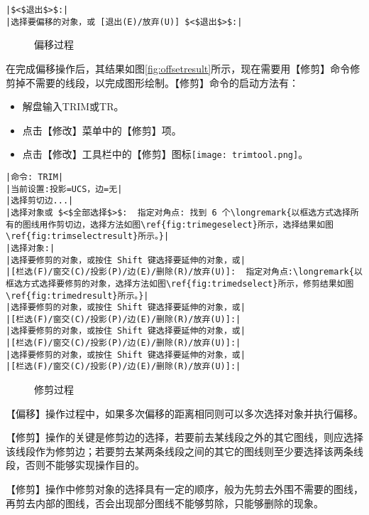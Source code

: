 \begin{procedure}
\begin{lstlisting}
|$<$退出$>$:|
|选择要偏移的对象，或 [退出(E)/放弃(U)] $<$退出$>$:|
\end{lstlisting}
\begin{figure}[htbp]
\hspace{20pt}
\hspace{20pt}
\caption{偏移过程}
\end{figure}
\item 在完成偏移操作后，其结果如图\ref{fig:offsetresult}所示，现在需要用【修剪】命令修剪掉不需要的线段，以完成图形绘制。【修剪】命令的启动方法有：
\begin{itemize}
\item 解盘输入TRIM或TR。
\item 点击【修改】菜单中的【修剪】项。
\item 点击【修改】工具栏中的【修剪】图标\texttt{[image: trimtool.png]}。
\end{itemize}
\begin{lstlisting}
|命令: TRIM|
|当前设置:投影=UCS，边=无|
|选择剪切边...|
|选择对象或 $<$全部选择$>$:  指定对角点: 找到 6 个\longremark{以框选方式选择所有的图线用作剪切边，选择方法如图\ref{fig:trimegeselect}所示，选择结果如图\ref{fig:trimselectresult}所示。}|
|选择对象:|
|选择要修剪的对象，或按住 Shift 键选择要延伸的对象，或|
|[栏选(F)/窗交(C)/投影(P)/边(E)/删除(R)/放弃(U)]:  指定对角点:\longremark{以框选方式选择要修剪的对象，选择方法如图\ref{fig:trimedselect}所示，修剪结果如图\ref{fig:trimedresult}所示。}|
|选择要修剪的对象，或按住 Shift 键选择要延伸的对象，或|
|[栏选(F)/窗交(C)/投影(P)/边(E)/删除(R)/放弃(U)]:|
|选择要修剪的对象，或按住 Shift 键选择要延伸的对象，或|
|[栏选(F)/窗交(C)/投影(P)/边(E)/删除(R)/放弃(U)]:|
|选择要修剪的对象，或按住 Shift 键选择要延伸的对象，或|
|[栏选(F)/窗交(C)/投影(P)/边(E)/删除(R)/放弃(U)]:|
\end{lstlisting}
\begin{figure}[htbp]
\hspace{20pt}
\hspace{20pt}
\hspace{20pt}
\caption{修剪过程}
\end{figure}
\showremarks
\end{procedure}
\begin{tips}
\item 【偏移】操作过程中，如果多次偏移的距离相同则可以多次选择对象并执行偏移。
\item 【修剪】操作的关键是修剪边的选择，若要前去某线段之外的其它图线，则应选择该线段作为修剪边；若要剪去某两条线段之间的其它的图线则至少要选择该两条线段，否则不能够实现操作目的。
\item 【修剪】操作中修剪对象的选择具有一定的顺序，般为先剪去外围不需要的图线，再剪去内部的图线，否会出现部分图线不能够剪除，只能够删除的现象。
\end{tips}

\endinput